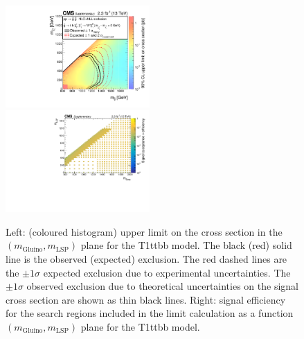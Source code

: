 \begin{figure}[t]
  \begin{center}
    \includegraphics[width=0.49\textwidth]{supplementary/figures/RA1T1ttbbXSEC} \, 
    \includegraphics[width=0.49\textwidth]{supplementary/figures/T1ttbb_merging_4_cats} \,     
  \end{center}
  \caption{Left: (coloured histogram) upper limit on the cross section in the $(m_{\mathrm{Gluino}},m_{\mathrm{LSP}})$ plane for the T1ttbb model. 
  The black (red) solid line is the observed (expected) exclusion. The red dashed lines are the $\pm1\sigma$ expected exclusion due to experimental uncertainties. 
  The $\pm1\sigma$ observed exclusion due to theoretical uncertainties on the signal cross section are shown as thin black lines. 
  Right: signal efficiency for the search regions included in the limit calculation as a function $(m_{\mathrm{Gluino}},m_{\mathrm{LSP}})$ plane for the T1ttbb model. 
  \label{fig:T1ttbb_excl}}
\end{figure}


